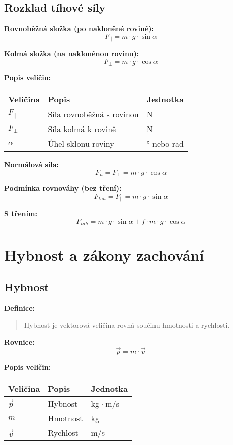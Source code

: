 \documentclass[11pt,a4paper]{article}
\begin{document}
\subsection{Rozklad tíhové síly}

\textbf{Rovnoběžná složka (po nakloněné rovině):}
\[F_{||} = m \cdot g \cdot \sin \alpha\]

\textbf{Kolmá složka (na nakloněnou rovinu):}
\[F_{\perp} = m \cdot g \cdot \cos \alpha\]

\textbf{Popis veličin:}

\begin{longtable}{lll}
\toprule
Veličina & Popis & Jednotka \\
\midrule
$F_{||}$ & Síla rovnoběžná s rovinou & N \\
$F_{\perp}$ & Síla kolmá k rovině & N \\
$\alpha$ & Úhel sklonu roviny & ° nebo rad \\
\bottomrule
\end{longtable}

\textbf{Normálová síla:}
\[F_n = F_{\perp} = m \cdot g \cdot \cos \alpha\]

\textbf{Podmínka rovnováhy (bez tření):}
\[F_{tah} = F_{||} = m \cdot g \cdot \sin \alpha\]

\textbf{S třením:}
\[F_{tah} = m \cdot g \cdot \sin \alpha + f \cdot m \cdot g \cdot \cos \alpha\]

\clearpage

\section{Hybnost a zákony zachování}

\subsection{Hybnost}

\textbf{Definice:}
\begin{quote}
Hybnost je vektorová veličina rovná součinu hmotnosti a rychlosti.
\end{quote}

\textbf{Rovnice:}
\[\vec{p} = m \cdot \vec{v}\]

\textbf{Popis veličin:}

\begin{longtable}{lll}
\toprule
Veličina & Popis & Jednotka \\
\midrule
$\vec{p}$ & Hybnost & kg·m/s \\
$m$ & Hmotnost & kg \\
$\vec{v}$ & Rychlost & m/s \\
\bottomrule
\end{longtable}
\end{document}
